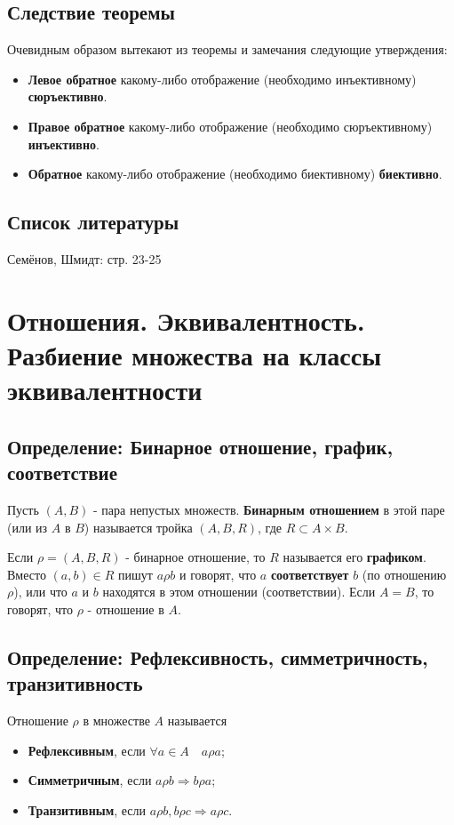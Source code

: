 \documentclass{article}
\begin{document}
\subsection{Следствие теоремы}
Очевидным образом вытекают из теоремы и замечания следующие утверждения:

\begin{itemize}
\item \textbf{Левое обратное} какому-либо отображение (необходимо инъективному) \textbf{сюръективно}.
\item \textbf{Правое обратное} какому-либо отображение (необходимо сюръективному) \textbf{инъективно}.
\item \textbf{Обратное} какому-либо отображение (необходимо биективному) \textbf{биективно}.
\end{itemize}


\subsection*{Список литературы}
Семёнов, Шмидт: стр. 23-25


\newpage
\section{Отношения. Эквивалентность. Разбиение множества на классы эквивалентности}

\subsection{Определение: Бинарное отношение, график, соответствие}
Пусть $(A, B)$ - пара непустых множеств. \textbf{Бинарным отношением} в этой паре (или из $A$ в $B$) называется тройка $(A, B, R)$, где $R \subset A \times B$.

Если $\rho = (A, B, R)$ - бинарное отношение, то $R$ называется его \textbf{графиком}. Вместо ${(a, b) \in R}$ пишут $a \rho b$ и говорят, что $a$ \textbf{соответствует} $b$ (по отношению $\rho$), или что $a$ и $b$ находятся в этом отношении (соответствии). Если $A = B$, то говорят, что $\rho$ - отношение в $A$.

\subsection{Определение: Рефлексивность, симметричность, транзитивность}
Отношение $\rho$ в множестве $A$ называется
\begin{itemize}
\item \textbf{Рефлексивным}, если $\forall a \in A \quad a \rho a$;
\item \textbf{Симметричным}, если $a \rho b \Rightarrow b \rho a$;
\item \textbf{Транзитивным}, если $a \rho b, b \rho c \Rightarrow a \rho c$.
\end{itemize}
\end{document}
